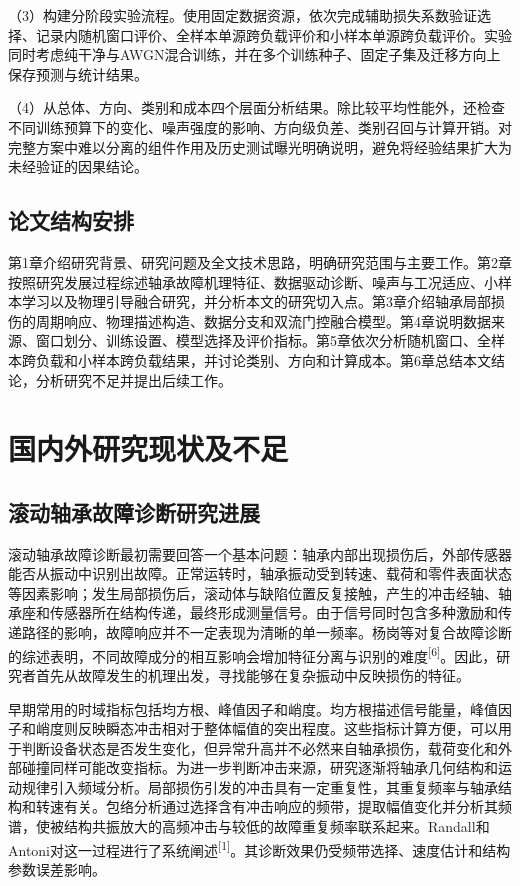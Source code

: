 \documentclass[UTF8,12pt,openany,twoside]{ctexbook}
\numberwithin{equation}{chapter}
\begin{document}
（3）构建分阶段实验流程。使用固定数据资源，依次完成辅助损失系数验证选择、记录内随机窗口评价、全样本单源跨负载评价和小样本单源跨负载评价。实验同时考虑纯干净与AWGN混合训练，并在多个训练种子、固定子集及迁移方向上保存预测与统计结果。

（4）从总体、方向、类别和成本四个层面分析结果。除比较平均性能外，还检查不同训练预算下的变化、噪声强度的影响、方向级负差、类别召回与计算开销。对完整方案中难以分离的组件作用及历史测试曝光明确说明，避免将经验结果扩大为未经验证的因果结论。

\section{论文结构安排}\label{ux8bbaux6587ux7ed3ux6784ux5b89ux6392}

第1章介绍研究背景、研究问题及全文技术思路，明确研究范围与主要工作。第2章按照研究发展过程综述轴承故障机理特征、数据驱动诊断、噪声与工况适应、小样本学习以及物理引导融合研究，并分析本文的研究切入点。第3章介绍轴承局部损伤的周期响应、物理描述构造、数据分支和双流门控融合模型。第4章说明数据来源、窗口划分、训练设置、模型选择及评价指标。第5章依次分析随机窗口、全样本跨负载和小样本跨负载结果，并讨论类别、方向和计算成本。第6章总结本文结论，分析研究不足并提出后续工作。

\chapter{国内外研究现状及不足}\label{ux7b2c2ux7ae0-ux56fdux5185ux5916ux7814ux7a76ux73b0ux72b6ux53caux4e0dux8db3}

\section{滚动轴承故障诊断研究进展}\label{ux8f74ux627fux6545ux969cux673aux7406ux4e0eux4fe1ux53f7ux5206ux6790ux7814ux7a76}

滚动轴承故障诊断最初需要回答一个基本问题：轴承内部出现损伤后，外部传感器能否从振动中识别出故障。正常运转时，轴承振动受到转速、载荷和零件表面状态等因素影响；发生局部损伤后，滚动体与缺陷位置反复接触，产生的冲击经轴、轴承座和传感器所在结构传递，最终形成测量信号。由于信号同时包含多种激励和传递路径的影响，故障响应并不一定表现为清晰的单一频率。杨岗等对复合故障诊断的综述表明，不同故障成分的相互影响会增加特征分离与识别的难度\textsuperscript{[6]}。因此，研究者首先从故障发生的机理出发，寻找能够在复杂振动中反映损伤的特征。

早期常用的时域指标包括均方根、峰值因子和峭度。均方根描述信号能量，峰值因子和峭度则反映瞬态冲击相对于整体幅值的突出程度。这些指标计算方便，可以用于判断设备状态是否发生变化，但异常升高并不必然来自轴承损伤，载荷变化和外部碰撞同样可能改变指标。为进一步判断冲击来源，研究逐渐将轴承几何结构和运动规律引入频域分析。局部损伤引发的冲击具有一定重复性，其重复频率与轴承结构和转速有关。包络分析通过选择含有冲击响应的频带，提取幅值变化并分析其频谱，使被结构共振放大的高频冲击与较低的故障重复频率联系起来。Randall和Antoni对这一过程进行了系统阐述\textsuperscript{[1]}。其诊断效果仍受频带选择、速度估计和结构参数误差影响。
\end{document}
